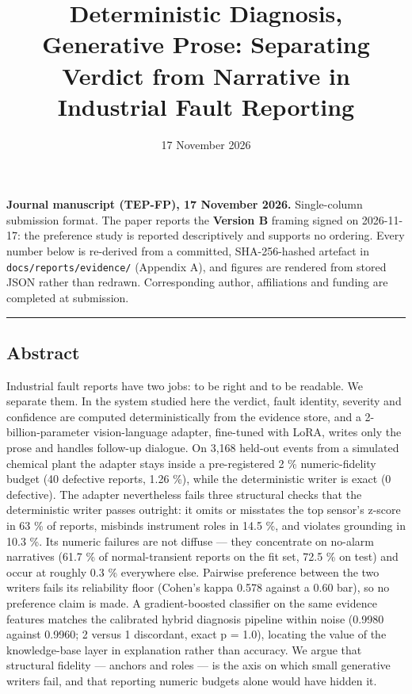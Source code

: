 \documentclass[
  10pt,
]{article}
\title{Deterministic Diagnosis, Generative Prose: Separating Verdict
from Narrative in Industrial Fault Reporting}
\author{}
\date{17 November 2026}
\begin{document}
\maketitle

\textbf{Journal manuscript (TEP-FP), 17 November 2026.} Single-column
submission format. The paper reports the \textbf{Version B} framing
signed on 2026-11-17: the preference study is reported descriptively and
supports no ordering. Every number below is re-derived from a committed,
SHA-256-hashed artefact in \texttt{docs/\allowbreak{}reports/\allowbreak{}evidence/\allowbreak{}} (Appendix A),
and figures are rendered from stored JSON rather than redrawn.
Corresponding author, affiliations and funding are completed at
submission.

\begin{center}\rule{0.5\linewidth}{0.5pt}\end{center}

\subsection{Abstract}\label{abstract}

Industrial fault reports have two jobs: to be right and to be readable.
We separate them. In the system studied here the verdict, fault
identity, severity and confidence are computed deterministically from
the evidence store, and a 2-billion-parameter vision-language adapter,
fine-tuned with LoRA, writes only the prose and handles follow-up
dialogue. On 3,168 held-out events from a simulated chemical plant the
adapter stays inside a pre-registered 2 \% numeric-fidelity budget (40
defective reports, 1.26 \%), while the deterministic writer is exact (0
defective). The adapter nevertheless fails three structural checks that
the deterministic writer passes outright: it omits or misstates the top
sensor's z-score in 63 \% of reports, misbinds instrument roles in 14.5
\%, and violates grounding in 10.3 \%. Its numeric failures are not
diffuse --- they concentrate on no-alarm narratives (61.7 \% of
normal-transient reports on the fit set, 72.5 \% on test) and occur at
roughly 0.3 \% everywhere else. Pairwise preference between the two
writers fails its reliability floor (Cohen's kappa 0.578 against a 0.60
bar), so no preference claim is made. A gradient-boosted classifier on
the same evidence features matches the calibrated hybrid diagnosis
pipeline within noise (0.9980 against 0.9960; 2 versus 1 discordant,
exact p = 1.0), locating the value of the knowledge-base layer in
explanation rather than accuracy. We argue that structural fidelity ---
anchors and roles --- is the axis on which small generative writers
fail, and that reporting numeric budgets alone would have hidden it.
\end{document}

